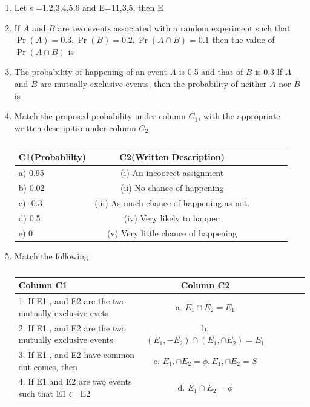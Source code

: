 \documentclass[12pt]{article}
\providecommand{\pr}[1]{\ensuremath{\Pr\left(#1\right)}}
\begin{document}
\begin{enumerate}[resume]
\item Let s ={1.2,3,4,5,6} and E={11,3,5}, then E
\item If $A$ and $B$ are two events associated  with a random experiment such that $\pr{A}=0.3, \pr{B}=0.2, \pr {A\cap B}=0.1$ then the value of $\pr{A\cap B}$ is
\item The probability of happening of an event $A$ is 0.5 and that of $B$ is 0.3 lf $A$ and $B$ are mutually exclusive events, then the probability of neither $A$ nor $B$ is
\item Match the proposed probability under column $C_1$, with the appropriate written descripitio under column $C_2$
\begin{table}[htbp]
 \begin{center}
    \begin{tabular}{|l|c|c|c|c|c} \hline \textbf{C1(Probablilty)}
  & \textbf{C2(Written Description)}  \\ \hline
     a) 0.95 & (i) An incoorect assignment\\ 
     b) 0.02 & (ii) No chance of happening\\ 
     c) -0.3 & (iii) As much chance of happening as not.\\
     d) 0.5 & (iv) Very likely to happen\\ 
     e) 0 & (v) Very little chance of happening\\ \hline
\end{tabular}   
\end{center}
\caption{\label{table:dummytable} }
\end{table}
\item Match the following
\begin{table}[htbp]
 \begin{center}
    \begin{tabular}{|l|c|c|c|c|c} \hline \textbf{Column C1}
  & \textbf{Column C2}  \\ \hline
     1. If E1 , and E2 are the two
mutually exclusive evets & a.  $E_1\cap E_2=E_1$\\ 
     2. If E1 , and E2 are the two
mutually exclusive events & b. $(E_1,-E_2)\cap (E_1,\cap E_2)=E_1$\\ 
     3. If E1 , and E2 have common out
comes, then & c.  $E_1,\cap E_2=\phi,E_1,\cap E_2=S$\\
     4. If E1 and E2 are two events such that E1$\subset$ E2 & d. $E_1\cap E_2=\phi$\\  \hline
\end{tabular}   
\end{center}
\caption{\label{table:dummy} }
\end{table}
\end{enumerate}
\end{document}
